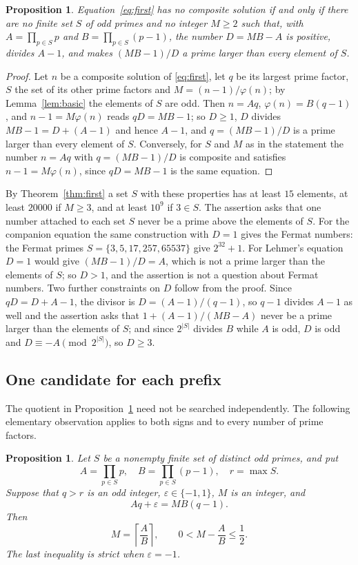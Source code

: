 \documentclass[11pt,reqno]{amsart}
\numberwithin{equation}{section}
\theoremstyle{plain}
\newtheorem{proposition}[theorem]{Proposition}
\theoremstyle{definition}
\theoremstyle{remark}
\begin{document}
\begin{proposition}\label{prop:equiv}
Equation~\eqref{eq:first} has no composite solution if and only if
there are no finite set $S$ of odd primes and no integer $M\ge2$ such
that, with $A=\prod_{p\in S}p$ and $B=\prod_{p\in S}(p-1)$, the number
$D=MB-A$ is positive, divides $A-1$, and makes $(MB-1)/D$ a prime
larger than every element of $S$.
\end{proposition}

\begin{proof}
Let $n$ be a composite solution of \eqref{eq:first}, let $q$ be its
largest prime factor, $S$ the set of its other prime factors and
$M=(n-1)/\varphi(n)$; by Lemma~\ref{lem:basic} the elements of $S$
are odd. Then $n=Aq$, $\varphi(n)=B(q-1)$, and $n-1=M\varphi(n)$ reads
$qD=MB-1$; so $D\ge1$, $D$ divides $MB-1=D+(A-1)$ and hence $A-1$,
and $q=(MB-1)/D$ is a prime larger than every element of $S$.
Conversely, for $S$ and $M$ as in the statement the number $n=Aq$ with
$q=(MB-1)/D$ is composite and satisfies $n-1=M\varphi(n)$, since
$qD=MB-1$ is the same equation.
\end{proof}

By Theorem~\ref{thm:first} a set $S$ with these properties has at
least $15$ elements, at least $20000$ if $M\ge3$, and at least $10^9$
if $3\in S$. The assertion asks that one number attached to each set
$S$ never be a prime above the elements of $S$. For the companion
equation the same construction with $D=1$ gives the Fermat numbers:
the Fermat primes $S=\{3,5,17,257,65537\}$ give $2^{32}+1$. For
Lehmer's equation $D=1$ would give $(MB-1)/D=A$, which is not a prime
larger than the elements of $S$; so $D>1$, and the assertion is not a
question about Fermat numbers. Two further constraints on $D$ follow
from the proof. Since $qD=D+A-1$, the divisor is
$D=(A-1)/(q-1)$, so $q-1$ divides $A-1$ as well and the assertion asks
that $1+(A-1)/(MB-A)$ never be a prime larger than the elements of
$S$; and since $2^{|S|}$ divides $B$ while $A$ is odd, $D$ is odd and
$D\equiv-A\pmod{2^{|S|}}$, so $D\ge3$.


\subsection{One candidate for each prefix}\label{sec:onecandidate}
The quotient in Proposition~\ref{prop:equiv} need not be searched
independently. The following elementary observation applies to both
signs and to every number of prime factors.

\begin{proposition}\label{prop:rounding}
Let $S$ be a nonempty finite set of distinct odd primes, and put
\[
 A=\prod_{p\in S}p,\quad B=\prod_{p\in S}(p-1),\quad r=\max S.
\]
Suppose that $q>r$ is an odd integer, $\varepsilon\in\{-1,1\}$,
$M$ is an integer, and
\[
 Aq+\varepsilon=MB(q-1).
\]
Then
\[
 M=\left\lceil\frac AB\right\rceil,\qquad
 0<M-\frac AB\le\frac12.
\]
The last inequality is strict when $\varepsilon=-1$.
\end{proposition}
\end{document}
